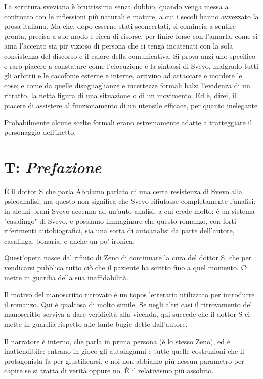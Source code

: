 La scrittura sveviana è bruttissima senza dubbio, quando venga messa a confronto con le inflessioni più naturali e mature, a cui i secoli hanno avvezzato la prosa italiana. Ma che, dopo esserne stati sconcertati, si comincia a sentire pronta, precisa a suo modo e ricca di risorse, per finire forse con l'amarla, come si ama l'accento sia pir vizioso di persona che ci tenga incatenati con la sola consistenza del discorso e il calore della comunicativa. Si prova anzi uno specifico e raro piacere a constatare come l'elocuzione e la sintassi di Svevo, malgrado tutti gli arbitrii e le cacofonie esterne e interne, arrivino ad attaccare e mordere le cose; e come da quelle disuguaglianze e incertezze formali balzi l'evidenza di un ritratto, la netta figura di una situazione o di un movimento. Ed è, direi, il piacere di assistere al funzionamento di un utensile efficace, per quanto inelegante

Probabilmente alcune scelte formali erano estremamente adatte a tratteggiare il personaggio dell'inetto.

\section{T: \textit{Prefazione}}

È il dottor S che parla
Abbiamo parlato di una certa resistenza di Svevo alla psicoanalisi, ma questo non significa che Svevo rifiutasse completamente l'analisi: in alcuni brani Svevo accenna ad un'auto analisi, a cui crede molto: è un sistema "casalingo" di Svevo, e possiamo immaginare che questo romanzo, con forti riferimenti autobiografici, sia una sorta di autoanalisi da parte dell'autore, casalinga, bonaria, e anche un po' ironica.

Quest'opera nasce dal rifiuto di Zeno di continuare la cura del dottor S, che per vendicarsi pubblica tutto ciò che il paziente ha scritto fino a quel momento.
Ci mette in guardia della sua inaffidabilità.

Il motivo del manoscritto ritrovato è un topos letterario utilizzato per introdurre il romanzo. Qui è qualcosa di molto simile.
Se negli altri casi il ritrovamento del manoscritto serviva a dare veridicità alla vicenda, qui succede che il dottor S ci mette in guardia rispetto alle tante bugie dette dall'autore.

Il narratore è interno, che parla in prima persona (è lo stesso Zeno), ed è inattendibile: entrano in gioco gli autoinganni e tutte quelle costruzioni che il protagonista fa per giustificarsi, e noi non abbiamo più nessun parametro per capire se si tratta di verità oppure no. È il relativismo più assoluto.

